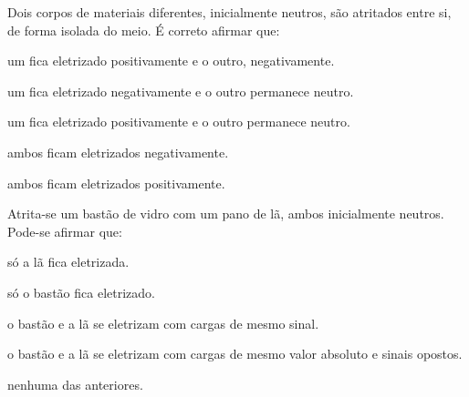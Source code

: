 \begin{questao}[1]{}
Dois corpos de materiais diferentes, inicialmente neutros, são atritados entre si,
de forma isolada do meio. É correto afirmar que:
\begin{alternativas}
\item um fica eletrizado positivamente e o outro, negativamente.
\item um fica eletrizado negativamente e o outro permanece neutro.
\item um fica eletrizado positivamente e o outro permanece neutro.
\item ambos ficam eletrizados negativamente.
\item ambos ficam eletrizados positivamente.
\end{alternativas}
\end{questao}

\begin{questao}[1]{}
Atrita-se um bastão de vidro com um pano de lã, ambos inicialmente neutros.
Pode-se afirmar que:
\begin{alternativas}
\item só a lã fica eletrizada.
\item só o bastão fica eletrizado.
\item o bastão e a lã se eletrizam com cargas de mesmo sinal.
\item o bastão e a lã se eletrizam com cargas de mesmo valor absoluto e sinais opostos.
\item nenhuma das anteriores.
\end{alternativas}
\end{questao}

